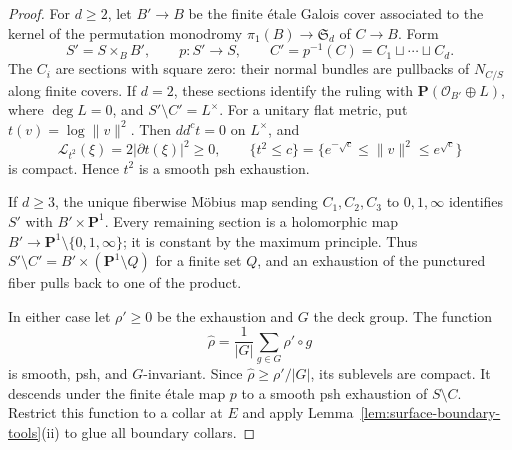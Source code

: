 \documentclass[11pt]{amsart}
\theoremstyle{definition}
\theoremstyle{remark}
\numberwithin{equation}{section}
\newcommand{\PP}{\mathbf P}
\newcommand{\OO}{\mathcal O}
\newcommand{\ddc}{dd^c}
\newcommand{\Levi}{\mathcal L}
\begin{document}
\begin{proof}
For $d\ge2$, let $B'\to B$ be the finite \'etale Galois cover
associated to the kernel of the permutation monodromy
$\pi_1(B)\to\mathfrak S_d$ of $C\to B$. Form
\[
 S'=S\times_B B',\qquad p:S'\to S,\qquad
 C'=p^{-1}(C)=C_1\sqcup\cdots\sqcup C_d.
\]
The $C_i$ are sections with square zero: their normal bundles are
pullbacks of $N_{C/S}$ along finite covers. If $d=2$, these sections
identify the ruling with $\PP(\OO_{B'}\oplus L)$, where
$\deg L=0$, and $S'\setminus C'=L^\times$. For a unitary flat
metric, put $t(v)=\log\|v\|^2$. Then $\ddc t=0$ on $L^\times$,
and
\[
 \Levi_{t^2}(\xi)=2|\partial t(\xi)|^2\ge0,\qquad
 \{t^2\le c\}=\{e^{-\sqrt c}\le\|v\|^2\le e^{\sqrt c}\}
\]
is compact. Hence $t^2$ is a smooth psh exhaustion.

If $d\ge3$, the unique fiberwise M\"obius map sending
$C_1,C_2,C_3$ to $0,1,\infty$ identifies $S'$ with
$B'\times\PP^1$. Every remaining section is a holomorphic map
$B'\to\PP^1\setminus\{0,1,\infty\}$; it is constant by the
maximum principle. Thus $S'\setminus C'=B'\times(\PP^1\setminus Q)$
for a finite set $Q$, and an exhaustion of the punctured fiber pulls
back to one of the product.

In either case let $\rho'\ge0$ be the exhaustion and $G$ the deck
group. The function
\[
 \widehat\rho=\frac1{|G|}\sum_{g\in G}\rho'\circ g
\]
is smooth, psh, and $G$-invariant. Since
$\widehat\rho\ge\rho'/|G|$, its sublevels are compact.
It descends under the finite \'etale map $p$ to a smooth psh
exhaustion of $S\setminus C$. Restrict this function to a collar
at $E$ and apply Lemma~\ref{lem:surface-boundary-tools}\textup{(ii)}
to glue all boundary collars.
\end{proof}
\end{document}
